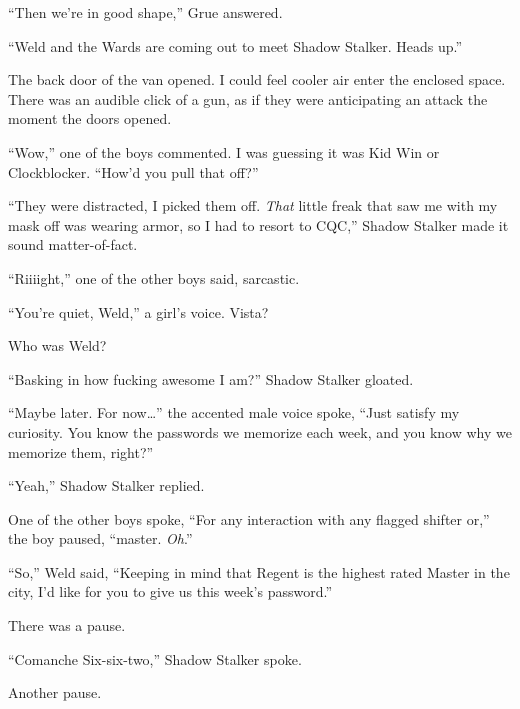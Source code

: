 ``Then we're in good shape,'' Grue answered.



``Weld and the Wards are coming out to meet Shadow Stalker.  Heads up.''



The back door of the van opened.  I could feel cooler air enter the enclosed space.  There was an audible click of a gun, as if they were anticipating an attack the moment the doors opened.



``Wow,'' one of the boys commented.  I was guessing it was Kid Win or Clockblocker.  ``How'd you pull that off?''



``They were distracted, I picked them off.  \emph{That} little freak that saw me with my mask off was wearing armor, so I had to resort to CQC,'' Shadow Stalker made it sound matter-of-fact.



``Riiiight,'' one of the other boys said, sarcastic.



``You're quiet, Weld,'' a girl's voice.  Vista?



Who was Weld?



``Basking in how fucking awesome I am?'' Shadow Stalker gloated.



``Maybe later.  For now\ldots'' the accented male voice spoke, ``Just satisfy my curiosity.  You know the passwords we memorize each week, and you know why we memorize them, right?''



``Yeah,'' Shadow Stalker replied.



One of the other boys spoke, ``For any interaction with any flagged shifter or,'' the boy paused, ``master.  \emph{Oh}.''



``So,'' Weld said, ``Keeping in mind that Regent is the highest rated Master in the city, I'd like for you to give us this week's password.''



There was a pause.



``Comanche Six-six-two,'' Shadow Stalker spoke.



Another pause.



